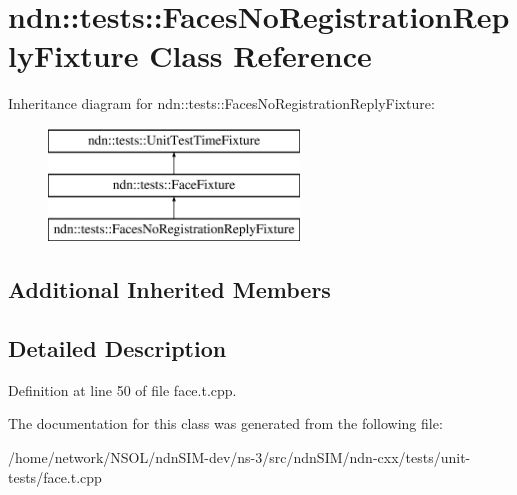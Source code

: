 \hypertarget{classndn_1_1tests_1_1FacesNoRegistrationReplyFixture}{}\section{ndn\+:\+:tests\+:\+:Faces\+No\+Registration\+Reply\+Fixture Class Reference}
\label{classndn_1_1tests_1_1FacesNoRegistrationReplyFixture}
Inheritance diagram for ndn\+:\+:tests\+:\+:Faces\+No\+Registration\+Reply\+Fixture\+:\begin{figure}[H]
\begin{center}
\leavevmode
\includegraphics[height=3.000000cm]{classndn_1_1tests_1_1FacesNoRegistrationReplyFixture}
\end{center}
\end{figure}
\subsection*{Additional Inherited Members}


\subsection{Detailed Description}


Definition at line 50 of file face.\+t.\+cpp.



The documentation for this class was generated from the following file\+:\begin{DoxyCompactItemize}
\item 
/home/network/\+N\+S\+O\+L/ndn\+S\+I\+M-\/dev/ns-\/3/src/ndn\+S\+I\+M/ndn-\/cxx/tests/unit-\/tests/face.\+t.\+cpp\end{DoxyCompactItemize}
